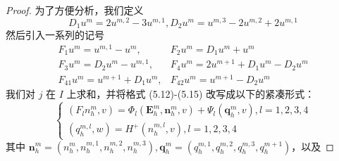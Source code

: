 \begin{proof}
    为了方便分析，我们定义
    \begin{equation*}
        D_1 u^m = 2 u^{m,2} - 3 u^{m,1}, D_2 u^m = u^{m,3} - 2 u^{m,2} + 2 u^{m,1}
    \end{equation*}
    然后引入一系列的记号
    \[
        \begin{array}{ll}
            F_1 u^m = u^{m,1} - u^m,        & F_2 u^m = D_1 u^m + u^m                 \\
            F_3 u^m = D_2 u^m - u^{m,1},    & F_4 u^m = 2 u^{m+1} + D_1 u^m - D_2 u^m \\
            F_{41} u^m = u^{m+1} + D_1 u^m, & F_{42} u^m = u^{m+1} - D_2 u^m
        \end{array}
    \]
    我们对 $j$ 在 $I$ 上求和，并将格式 (5.12)-(5.15) 改写成以下的紧凑形式：
    \[
        \left\{\begin{array}{l}
            (F_l n_h^m, v) = \Phi_l (\boldsymbol{E}_h^m, \boldsymbol{n}_h^m, v) + \Psi_l (\boldsymbol{q}_h^m, v), l=1,2,3,4 \\
            (q_h^{m,l}, w) = H^+ (n_h^{m,l}, v), l=1,2,3,4
        \end{array}\right.
    \]
    其中 $\boldsymbol{n}_h^m = (n_h^m, n_h^{m,1}, n_h^{m,2}, n_h^{m,3}), \boldsymbol{q}_h^m = (q_h^{m,1}, q_h^{m,2}, q_h^{m,3}, q_h^{m+1})$，以及


\end{proof}
